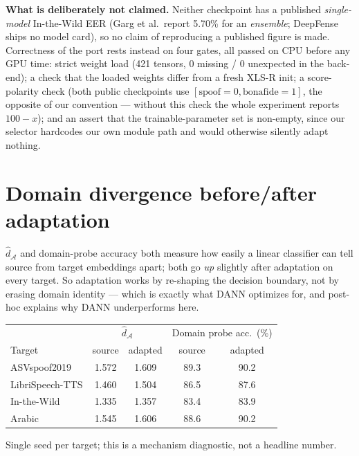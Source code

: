 \documentclass[11pt]{article}
\begin{document}
\textbf{What is deliberately not claimed.} Neither checkpoint has a published
\emph{single-model} In-the-Wild EER (Garg et al.\ report 5.70\% for an
\emph{ensemble}; DeepFense ships no model card), so no claim of reproducing a
published figure is made. Correctness of the port rests instead on four gates,
all passed on CPU before any GPU time: strict weight load (421 tensors, 0
missing / 0 unexpected in the back-end); a check that the loaded weights differ
from a fresh XLS-R init; a score-polarity check (both public checkpoints use
$[\text{spoof}=0,\text{bonafide}=1]$, the opposite of our convention --- without
this check the whole experiment reports $100-x$); and an assert that the
trainable-parameter set is non-empty, since our selector hardcodes our own
module path and would otherwise silently adapt nothing.

\newpage
\section*{Domain divergence before/after adaptation}
$\hat d_\mathcal{A}$ and domain-probe accuracy both measure how easily a linear
classifier can tell source from target embeddings apart; both go \emph{up}
slightly after adaptation on every target. So adaptation works by re-shaping the
decision boundary, not by erasing domain identity --- which is exactly what DANN
optimizes for, and post-hoc explains why DANN underperforms here.
\begin{table}[h]
\centering
\begin{tabular}{@{}lcccc@{}}
\toprule
& \multicolumn{2}{c}{$\hat d_{\mathcal{A}}$} & \multicolumn{2}{c}{Domain probe acc.\ (\%)} \\
Target & source & adapted & source & adapted \\
\midrule
ASVspoof2019 & 1.572 & 1.609 & 89.3 & 90.2 \\
LibriSpeech-TTS & 1.460 & 1.504 & 86.5 & 87.6 \\
In-the-Wild & 1.335 & 1.357 & 83.4 & 83.9 \\
Arabic & 1.545 & 1.606 & 88.6 & 90.2 \\
\bottomrule
\end{tabular}
\end{table}

Single seed per target; this is a mechanism diagnostic, not a headline number.
\end{document}
